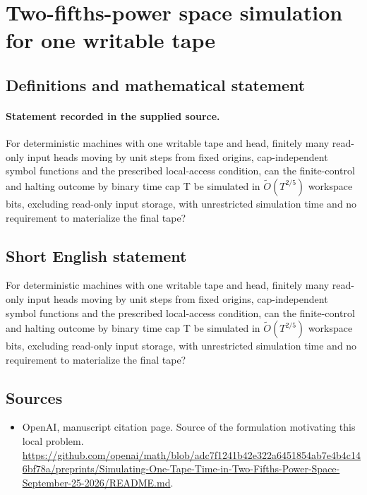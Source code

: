 \documentclass[11pt]{article}
\begin{document}
\section*{Two-fifths-power space simulation for one writable tape}\label{30007471}
\subsection{Definitions and mathematical statement}
\paragraph{Statement recorded in the supplied source.}
For deterministic machines with one writable tape and head, finitely many read-only input heads moving by unit steps from fixed origins, cap-independent symbol functions and the prescribed local-access condition, can the finite-control and halting outcome by binary time cap T be simulated in $\widetilde O(T^{2/5})$ workspace bits, excluding read-only input storage, with unrestricted simulation time and no requirement to materialize the final tape?
\subsection{Short English statement}
For deterministic machines with one writable tape and head, finitely many read-only input heads moving by unit steps from fixed origins, cap-independent symbol functions and the prescribed local-access condition, can the finite-control and halting outcome by binary time cap T be simulated in $\widetilde O(T^{2/5})$ workspace bits, excluding read-only input storage, with unrestricted simulation time and no requirement to materialize the final tape?
\subsection{Sources}
\begin{itemize}
\item[S1] OpenAI, manuscript citation page. Source of the formulation motivating this local problem.
\url{https://github.com/openai/math/blob/adc7f1241b42e322a6451854ab7e4b4c146bf78a/preprints/Simulating-One-Tape-Time-in-Two-Fifths-Power-Space-September-25-2026/README.md}.
\end{itemize}
\end{document}

